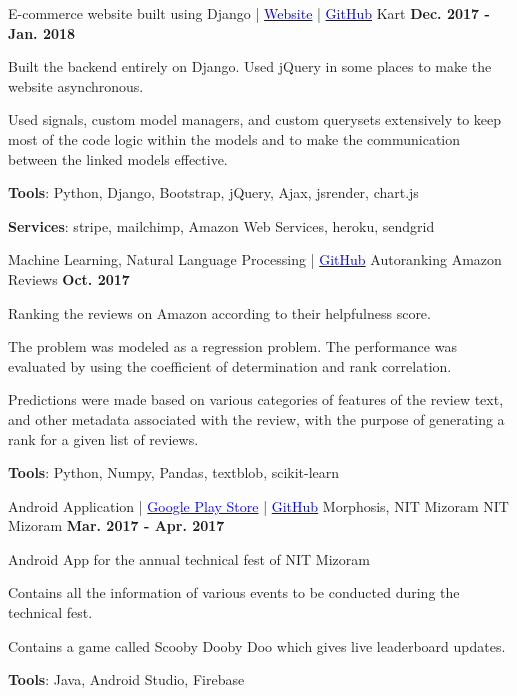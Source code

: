 \begin{cventries}
    \cventry
    {E-commerce website built using Django | \href{https://shan-kart.herokuapp.com/}{\textcolor{Blue}{Website}} | \href{https://github.com/shan18/Kart}{\textcolor{Blue}{GitHub}}}
    {Kart}
    {}
    {\textbf{Dec. 2017 - Jan. 2018}}
    {
        \begin{cvitems}
          \item{Built the backend entirely on Django. Used jQuery in some places to make the website asynchronous.}
          \item{Used signals, custom model managers, and custom querysets extensively to keep most of the code logic within the models and to make the communication between the linked models effective.}
          \item{\textbf{Tools}: Python, Django, Bootstrap, jQuery, Ajax, jsrender, chart.js}
          \item{\textbf{Services}: stripe, mailchimp, Amazon Web Services, heroku, sendgrid}
        \end{cvitems}
    }
    \cventry
    {Machine Learning, Natural Language Processing | \href{https://github.com/shan18/Autoranking-Amazon-Reviews}{\textcolor{Blue}{GitHub}}}
    {Autoranking Amazon Reviews}
    {}
    {\textbf{Oct. 2017}}
    {
      \begin{cvitems}
        \item{Ranking the reviews on Amazon according to their helpfulness score.}
        \item{The problem was modeled as a regression problem. The performance was evaluated by using the coefficient of determination and rank correlation.}
        \item{Predictions were made based on various categories of features of the review text, and other metadata associated with the review, with the purpose of generating a rank for a given list of reviews.}
        \item{\textbf{Tools}: Python, Numpy, Pandas, textblob, scikit-learn}
      \end{cvitems}
    }
    \cventry
    {Android Application | \href{https://play.google.com/store/apps/details?id=com.nitmz.morphosis&hl=en}{\textcolor{Blue}{Google Play Store}} | \href{https://github.com/shan18/Morphosis}{\textcolor{Blue}{GitHub}}}
    {Morphosis, NIT Mizoram}
    {NIT Mizoram}
    {\textbf{Mar. 2017 - Apr. 2017}}
    {
      \begin{cvitems}
        \item {Android App for the annual technical fest of NIT Mizoram}
        \item{Contains all the information of various events to be conducted during the technical fest.}
        \item{Contains a game called Scooby Dooby Doo which gives live leaderboard updates.}
        \item{\textbf{Tools}: Java, Android Studio, Firebase}
      \end{cvitems}
    }
\end{cventries}  

